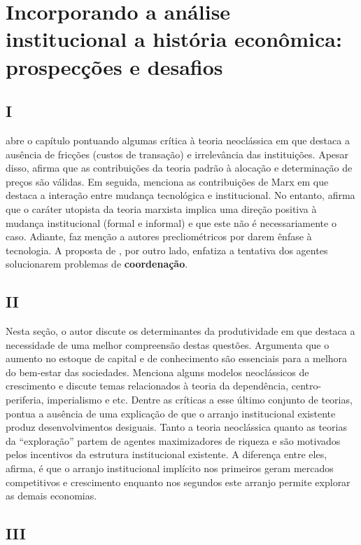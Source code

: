 \section*{Incorporando a análise institucional a história econômica: prospecções e desafios}


\subsection*{I}

\autor abre o capítulo pontuando algumas crítica à teoria neoclássica em que destaca a ausência de fricções (custos de transação) e irrelevância das instituições. Apesar disso, afirma que as contribuições da teoria padrão à alocação e determinação de preços são válidas. Em seguida, menciona as contribuições de Marx em que destaca a interação entre mudança tecnológica e institucional. No entanto, afirma que o caráter utopista da teoria marxista implica uma direção positiva à mudança institucional (formal e informal) e que este não é necessariamente o caso. Adiante, faz menção a autores precliométricos por darem ênfase à tecnologia. A proposta de \autor, por outro lado, enfatiza a tentativa dos agentes solucionarem problemas de \textbf{coordenação}.


\subsection*{II}

Nesta seção, o autor discute os determinantes da produtividade em que destaca a necessidade de uma melhor compreensão destas questões. Argumenta que o aumento no estoque de capital e de conhecimento são essenciais para a melhora do bem-estar das sociedades. Menciona alguns modelos neoclássicos de crescimento e discute temas relacionados à teoria da dependência, centro-periferia, imperialismo e etc. Dentre as críticas a esse último conjunto de teorias, pontua a ausência de uma explicação de que o arranjo institucional existente produz desenvolvimentos desiguais. Tanto a teoria neoclássica quanto as teorias da ``exploração'' partem de agentes maximizadores de riqueza e são motivados pelos incentivos da estrutura institucional existente. A diferença entre eles, afirma, é que o arranjo institucional implícito nos primeiros geram mercados competitivos e crescimento enquanto nos segundos este arranjo permite explorar as demais economias.


\subsection*{III}

